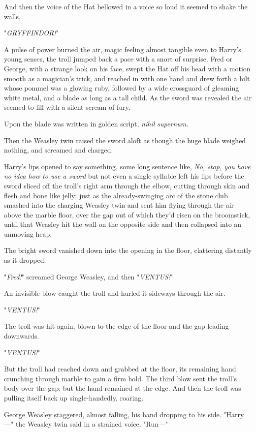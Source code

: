 And then the voice of the Hat bellowed in a voice so loud it seemed to shake
the walls,

"\emph{GRYFFINDOR!}"

A pulse of power burned the air, magic feeling almost tangible even to Harry's
young senses, the troll jumped back a pace with a snort of surprise. Fred or
George, with a strange look on his face, swept the Hat off his head with a
motion smooth as a magician's trick, and reached in with one hand and drew
forth a hilt whose pommel was a glowing ruby, followed by a wide crossguard of
gleaming white metal, and a blade as long as a tall child. As the sword was
revealed the air seemed to fill with a silent scream of fury.

Upon the blade was written in golden script, \emph{nihil supernum.}

Then the Weasley twin raised the sword aloft as though the huge blade weighed
nothing, and screamed and charged.

Harry's lips opened to say something, some long sentence like, \emph{No, stop,
you have no idea how to use a sword} but not even a single syllable left his
lips before the sword sliced off the troll's right arm through the elbow,
cutting through skin and flesh and bone like jelly; just as the
already-swinging arc of the stone club smashed into the charging Weasley twin
and sent him flying through the air above the marble floor, over the gap out of
which they'd risen on the broomstick, until that Weasley hit the wall on the
opposite side and then collapsed into an unmoving heap.

The bright sword vanished down into the opening in the floor, clattering
distantly as it dropped.

"\emph{Fred!}" screamed George Weasley, and then "\emph{VENTUS!}"

An invisible blow caught the troll and hurled it sideways through the air.

"\emph{VENTUS!}"

The troll was hit again, blown to the edge of the floor and the gap leading
downwards.

"\emph{VENTUS!}"

But the troll had reached down and grabbed at the floor, its remaining hand
crunching through marble to gain a firm hold. The third blow sent the troll's
body over the gap; but the hand remained at the edge. And then the troll was
pulling itself back up single-handedly, roaring.

George Weasley staggered, almost falling, his hand dropping to his side.
"Harry---" the Weasley twin said in a strained voice, "Run---"

